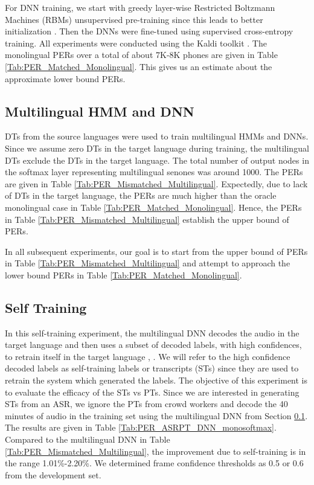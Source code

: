 \documentclass[a4paper]{article}
\begin{document}
For DNN training, we start with greedy layer-wise Restricted Boltzmann Machines (RBMs) unsupervised pre-training since this leads to better initialization \cite{Bengio-Pretraining}. Then the DNNs were fine-tuned using supervised cross-entropy training.  All experiments were conducted using the Kaldi toolkit \cite{Povey-Kaldi}. The monolingual PERs over a total of about 7K-8K phones  are given in Table \ref{Tab:PER_Matched_Monolingual}. This gives us an estimate about the approximate lower bound PERs.

\subsection{Multilingual HMM and DNN}
\label{sec:Multilingual HMM and DNN}
DTs from the source languages were used to train multilingual HMMs and DNNs. Since we assume zero DTs in the target language during training, the multilingual DTs exclude the DTs in the target language.  The total number of output nodes in the softmax layer representing multilingual senones was around 1000.  The PERs are given in Table \ref{Tab:PER_Mismatched_Multilingual}. Expectedly, due to lack of DTs in the target language, the PERs are much higher than the oracle monolingual case in Table \ref{Tab:PER_Matched_Monolingual}. Hence, the PERs in Table \ref{Tab:PER_Mismatched_Multilingual} establish the upper bound of PERs.


In all subsequent experiments, our goal is to start from the upper bound of PERs in Table \ref{Tab:PER_Mismatched_Multilingual} and attempt to approach the lower bound PERs in Table \ref{Tab:PER_Matched_Monolingual}. 

\subsection{Self Training}
In this self-training experiment, the multilingual DNN decodes the audio in the target language and then uses a subset of decoded labels, with high confidences, to retrain itself in the target language \cite{Knill-SelfTrainingAndUnsupAdapt}, \cite{Vesely-SemisupTrainingDNN}. We will refer to the high confidence decoded labels as self-training labels or transcripts (STs) since they are used to retrain the system which generated the labels. The objective of this experiment is to evaluate the efficacy of the STs vs PTs. Since we are interested in generating STs from an ASR, we ignore the PTs from crowd workers and decode the 40 minutes of audio in the training set using the multilingual DNN from Section \ref{sec:Multilingual HMM and DNN}. The results are given in Table \ref{Tab:PER_ASRPT_DNN_monosoftmax}. Compared to the multilingual DNN in Table \ref{Tab:PER_Mismatched_Multilingual}, the improvement due to self-training is in the range 1.01\%-2.20\%. We determined frame confidence thresholds as 0.5 or 0.6 from the development set.
\end{document}
